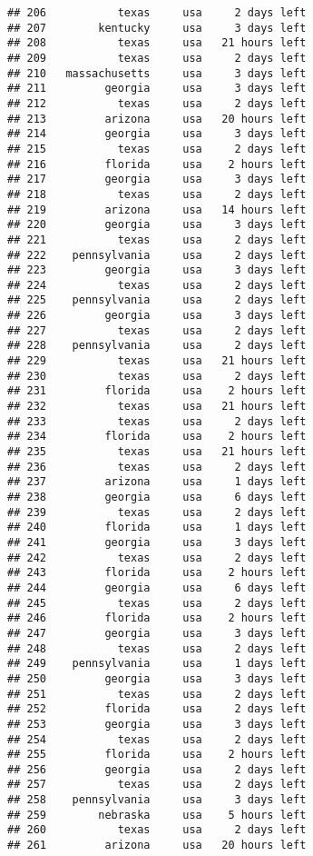 \documentclass[
]{article}
\begin{document}
\begin{verbatim}
## 206           texas     usa     2 days left
## 207        kentucky     usa     3 days left
## 208           texas     usa   21 hours left
## 209           texas     usa     2 days left
## 210   massachusetts     usa     3 days left
## 211         georgia     usa     3 days left
## 212           texas     usa     2 days left
## 213         arizona     usa   20 hours left
## 214         georgia     usa     3 days left
## 215           texas     usa     2 days left
## 216         florida     usa    2 hours left
## 217         georgia     usa     3 days left
## 218           texas     usa     2 days left
## 219         arizona     usa   14 hours left
## 220         georgia     usa     3 days left
## 221           texas     usa     2 days left
## 222    pennsylvania     usa     2 days left
## 223         georgia     usa     3 days left
## 224           texas     usa     2 days left
## 225    pennsylvania     usa     2 days left
## 226         georgia     usa     3 days left
## 227           texas     usa     2 days left
## 228    pennsylvania     usa     2 days left
## 229           texas     usa   21 hours left
## 230           texas     usa     2 days left
## 231         florida     usa    2 hours left
## 232           texas     usa   21 hours left
## 233           texas     usa     2 days left
## 234         florida     usa    2 hours left
## 235           texas     usa   21 hours left
## 236           texas     usa     2 days left
## 237         arizona     usa     1 days left
## 238         georgia     usa     6 days left
## 239           texas     usa     2 days left
## 240         florida     usa     1 days left
## 241         georgia     usa     3 days left
## 242           texas     usa     2 days left
## 243         florida     usa    2 hours left
## 244         georgia     usa     6 days left
## 245           texas     usa     2 days left
## 246         florida     usa    2 hours left
## 247         georgia     usa     3 days left
## 248           texas     usa     2 days left
## 249    pennsylvania     usa     1 days left
## 250         georgia     usa     3 days left
## 251           texas     usa     2 days left
## 252         florida     usa     2 days left
## 253         georgia     usa     3 days left
## 254           texas     usa     2 days left
## 255         florida     usa    2 hours left
## 256         georgia     usa     2 days left
## 257           texas     usa     2 days left
## 258    pennsylvania     usa     3 days left
## 259        nebraska     usa    5 hours left
## 260           texas     usa     2 days left
## 261         arizona     usa   20 hours left

\end{verbatim}
\end{document}
